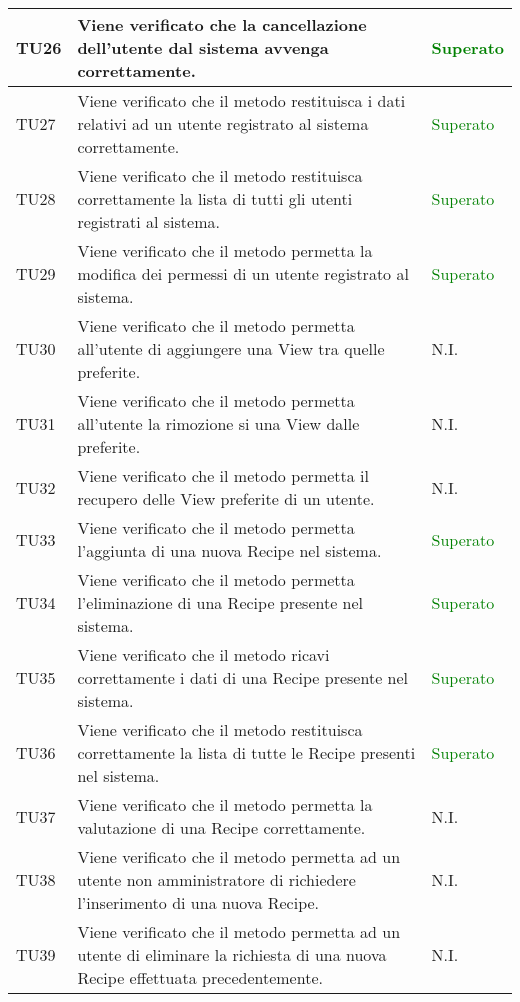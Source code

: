 \begin{center}
\begin{longtable}{| p{2cm} | p{8cm} | p{2.5cm} |}
					\hline
					TU26 & Viene verificato che la cancellazione dell'utente dal sistema avvenga correttamente. & \textcolor{green}{Superato}\\
					\hline
					TU27 & Viene verificato che il metodo restituisca i dati relativi ad un utente registrato al sistema correttamente. & \textcolor{green}{Superato}\\
					\hline
					TU28 & Viene verificato che il metodo restituisca correttamente la lista di tutti gli utenti registrati al sistema. & \textcolor{green}{Superato}\\
					\hline
					TU29 & Viene verificato che il metodo permetta la modifica dei permessi di un utente registrato al sistema. & \textcolor{green}{Superato}\\
					\hline
					TU30 & Viene verificato che il metodo permetta all'utente di aggiungere una View tra quelle preferite. & N.I.\\
					\hline
					TU31 & Viene verificato che il metodo permetta all'utente la rimozione si una View dalle preferite. & N.I.\\
					\hline
					TU32 & Viene verificato che il metodo permetta il recupero delle View preferite di un utente. & N.I.\\
					\hline
					TU33 & Viene verificato che il metodo permetta l'aggiunta di una nuova Recipe nel sistema. & \textcolor{green}{Superato}\\
					\hline
					TU34 & Viene verificato che il metodo permetta l'eliminazione di una Recipe presente nel sistema. & \textcolor{green}{Superato}\\
					\hline
					TU35 & Viene verificato che il metodo ricavi correttamente i dati di una Recipe presente nel sistema. & \textcolor{green}{Superato}\\
					\hline
					TU36 & Viene verificato che il metodo restituisca correttamente la lista di tutte le Recipe presenti nel sistema. & \textcolor{green}{Superato}\\
					\hline
					TU37 & Viene verificato che il metodo permetta la valutazione di una Recipe correttamente. & N.I.\\
					\hline
					TU38 & Viene verificato che il metodo permetta ad un utente non amministratore di richiedere l'inserimento di una nuova Recipe. & N.I.\\
					\hline
					TU39 & Viene verificato che il metodo permetta ad un utente di eliminare la richiesta di una nuova Recipe effettuata precedentemente. & N.I.\\
					\hline

\end{longtable}
\end{center}
